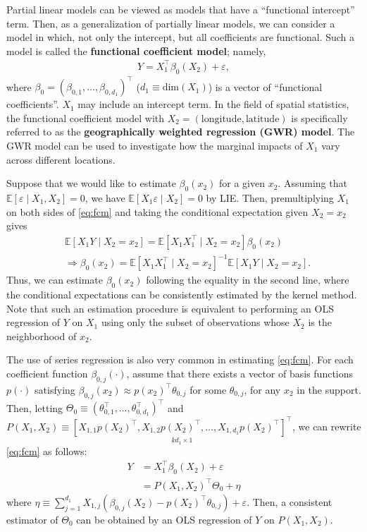 \documentclass[10.5pt, A4paper, openany, uplatex]{book}
\newcommand{\eps}{\varepsilon}
\newcommand{\E}{\mathbb{E}}
\numberwithin{equation}{section}
\begin{document}
Partial linear models can be viewed as models that have a ``functional intercept'' term.
Then, as a generalization of partially linear models, we can consider a model in which, not only the intercept, but all coefficients are functional.
Such a model is called the \textbf{functional coefficient model}; namely, 
\begin{align}\label{eq:fcm}
	Y = X_1^\top\beta_0(X_2) + \eps,
\end{align}
where $\beta_0 = (\beta_{0,1}, \ldots, \beta_{0,d_1})^\top$ ($d_1 \equiv \text{dim}(X_1)$) is a vector of ``functional coefficients''.
$X_1$ may include an intercept term.
In the field of spatial statistics, the functional coefficient model with $X_2 = (\text{longitude}, \text{latitude})$ is specifically referred to as the \textbf{geographically weighted regression (GWR) model}.
The GWR model can be used to investigate how the marginal impacts of $X_1$ vary across different locations.

Suppose that we would like to estimate $\beta_0(x_2)$ for a given $x_2$.
Assuming that $\E[\eps \mid X_1, X_2] = 0$, we have $\E[X_1 \eps \mid X_2] = 0$ by LIE.
Then, premultiplying $X_1$ on both sides of \eqref{eq:fcm} and taking the conditional expectation given $X_2 = x_2$ gives
\begin{align*}
	& \E[ X_1 Y \mid X_2 = x_2] = \E[ X_1  X_1^\top \mid X_2 = x_2] \beta_0(x_2)\\
	& \Longrightarrow \beta_0(x_2) = \E[ X_1  X_1^\top \mid X_2 = x_2]^{-1} \E[ X_1 Y \mid X_2 = x_2].
\end{align*}
Thus, we can estimate $\beta_0(x_2)$ following the equality in the second line, where the conditional expectations can be consistently estimated by the kernel method.
Note that such an estimation procedure is equivalent to performing an OLS regression of $Y$ on $X_1$ using only the subset of observations whose $X_2$ is the neighborhood of $x_2$.

The use of series regression is also very common in estimating \eqref{eq:fcm}.
For each coefficient function $\beta_{0,j}(\cdot)$, assume that there exists a vector of basis functions $p(\cdot)$ satisfying $\beta_{0,j}(x_2) \approx p(x_2)^\top \theta_{0,j}$ for some $\theta_{0,j}$, for any $x_2$ in the support.
Then, letting $\Theta_0 \equiv (\theta_{0,1}^\top, \ldots, \theta_{0,d_1}^\top)^\top$ and $P(X_1, X_2) \equiv \underset{k d_1 \times 1}{\left[X_{1,1}p(X_2)^\top, X_{1,2}p(X_2)^\top, \ldots, X_{1,d_1}p(X_2)^\top \right]^\top}$, we can rewrite \eqref{eq:fcm} as follows:
\begin{align*}
	Y
	& = X_1^\top\beta_0(X_2) + \eps\\
	& = P(X_1, X_2)^\top\Theta_0 + \eta
\end{align*}
where $\eta \equiv \sum_{j = 1}^{d_1}X_{1,j}(\beta_{0,j}(X_2) - p(X_2)^\top \theta_{0,j}) + \eps$.
Then, a consistent estimator of $\Theta_0$ can be obtained by an OLS regression of $Y$ on $P(X_1, X_2)$.
\end{document}
